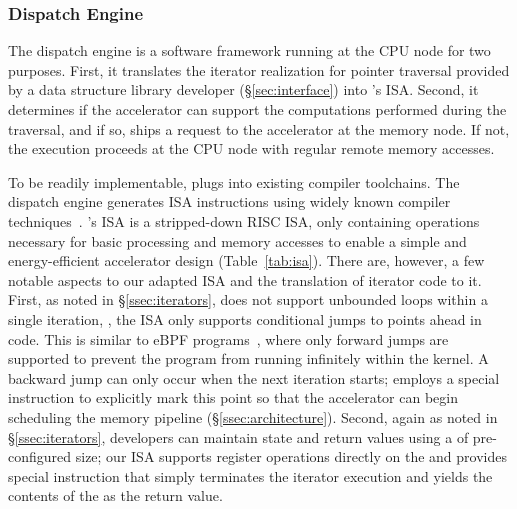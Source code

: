 \subsubsection{\pulse Dispatch Engine}
\label{sssec:compute_node}
The dispatch engine is a software framework running at the CPU node for two purposes.  First, it translates the iterator realization for pointer traversal provided by a data structure library developer (\S\ref{sec:interface}) into \pulse's ISA. Second, it determines if the accelerator can support the computations performed during the traversal, and if so, ships a request to the accelerator at the memory node. If not, the execution proceeds at the CPU node with regular remote memory accesses.

 To be readily implementable, \pulse plugs into existing compiler toolchains. The dispatch engine generates \pulse ISA instructions using widely known compiler techniques~\cite{llvm}. 
\pulse's ISA is a stripped-down RISC ISA, only containing operations necessary for basic processing and memory accesses to enable a simple and energy-efficient accelerator design (Table~\ref{tab:isa}). There are, however, a few notable aspects to our adapted ISA and the translation of iterator code to it. First, as noted in \S\ref{ssec:iterators}, \pulse does not support unbounded loops within a single iteration, \ie, the ISA only supports conditional jumps to points ahead in code. This is similar to eBPF programs~\cite{ebpfjump}, where only forward jumps are supported to prevent the program from running infinitely within the kernel. A backward jump can only occur when the next iteration starts; \pulse employs a special  instruction to explicitly mark this point so that the accelerator can begin scheduling the memory pipeline (\S\ref{ssec:architecture}). Second, again as noted in \S\ref{ssec:iterators}, developers can maintain state and return values using a  of pre-configured size; our ISA supports register operations directly on the  and provides special  instruction that simply terminates the iterator execution and yields the contents of the  as the return value. 

